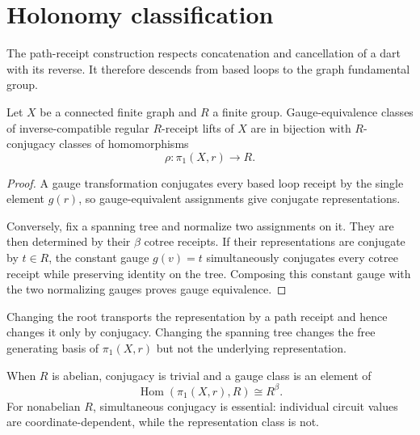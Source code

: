 \section{Holonomy classification}

The path-receipt construction respects concatenation and cancellation of a
dart with its reverse. It therefore descends from based loops to the graph
fundamental group.

\begin{theorem}
Let $X$ be a connected finite graph and $R$ a finite group. Gauge-equivalence
classes of inverse-compatible regular $R$-receipt lifts of $X$ are in
bijection with $R$-conjugacy classes of homomorphisms
\[
\rho:\pi_1(X,r)\longrightarrow R.
\]
\end{theorem}

\begin{proof}
A gauge transformation conjugates every based loop receipt by the single
element $g(r)$, so gauge-equivalent assignments give conjugate
representations.

Conversely, fix a spanning tree and normalize two assignments on it. They are
then determined by their $\beta$ cotree receipts. If their representations
are conjugate by $t\in R$, the constant gauge $g(v)=t$ simultaneously
conjugates every cotree receipt while preserving identity on the tree.
Composing this constant gauge with the two normalizing gauges proves gauge
equivalence.
\end{proof}

Changing the root transports the representation by a path receipt and hence
changes it only by conjugacy. Changing the spanning tree changes the free
generating basis of $\pi_1(X,r)$ but not the underlying representation.

When $R$ is abelian, conjugacy is trivial and a gauge class is an element of
\[
\operatorname{Hom}(\pi_1(X,r),R)\cong R^{\beta}.
\]
For nonabelian $R$, simultaneous conjugacy is essential: individual circuit
values are coordinate-dependent, while the representation class is not.
